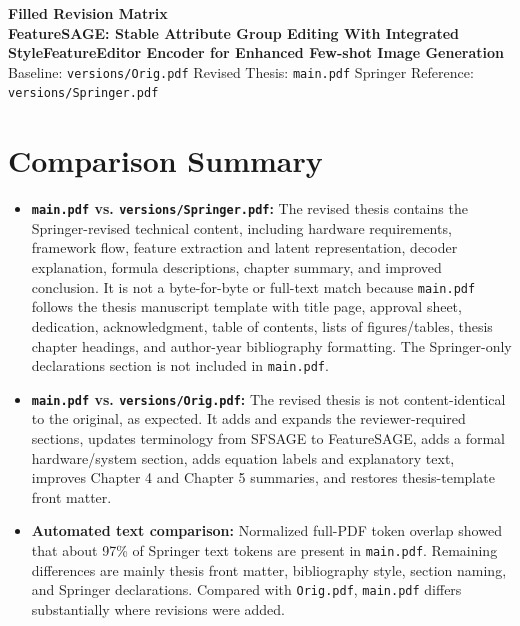 \documentclass[11pt]{article}
\begin{document}
\begin{center}
{\Large\textbf{Filled Revision Matrix}}\\
\vspace{3pt}
\textbf{FeatureSAGE: Stable Attribute Group Editing With Integrated StyleFeatureEditor Encoder for Enhanced Few-shot Image Generation}\\
\vspace{3pt}
Baseline: \texttt{versions/Orig.pdf} \quad Revised Thesis: \texttt{main.pdf} \quad Springer Reference: \texttt{versions/Springer.pdf}
\end{center}

\section*{Comparison Summary}

\begin{itemize}[leftmargin=*]
    \item \textbf{\texttt{main.pdf} vs. \texttt{versions/Springer.pdf}:} The revised thesis contains the Springer-revised technical content, including hardware requirements, framework flow, feature extraction and latent representation, decoder explanation, formula descriptions, chapter summary, and improved conclusion. It is not a byte-for-byte or full-text match because \texttt{main.pdf} follows the thesis manuscript template with title page, approval sheet, dedication, acknowledgment, table of contents, lists of figures/tables, thesis chapter headings, and author-year bibliography formatting. The Springer-only declarations section is not included in \texttt{main.pdf}.
    \item \textbf{\texttt{main.pdf} vs. \texttt{versions/Orig.pdf}:} The revised thesis is not content-identical to the original, as expected. It adds and expands the reviewer-required sections, updates terminology from SFSAGE to FeatureSAGE, adds a formal hardware/system section, adds equation labels and explanatory text, improves Chapter 4 and Chapter 5 summaries, and restores thesis-template front matter.
    \item \textbf{Automated text comparison:} Normalized full-PDF token overlap showed that about 97\% of Springer text tokens are present in \texttt{main.pdf}. Remaining differences are mainly thesis front matter, bibliography style, section naming, and Springer declarations. Compared with \texttt{Orig.pdf}, \texttt{main.pdf} differs substantially where revisions were added.
\end{itemize}
\end{document}
